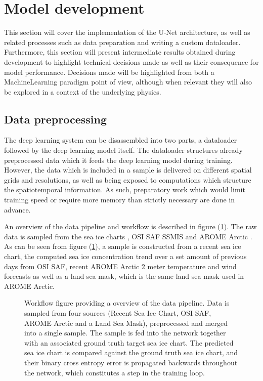 \documentclass[../main/thesis]{subfiles}
\begin{document}
\section{Model development}
\label{sec:developing a unet}
This section will cover the implementation of the U-Net architecture, as well as related processes such as data preparation and writing a custom dataloader. Furthermore, this section will present intermediate results obtained during development to highlight technical decisions made as well as their consequence for model performance. Decisions made will be highlighted from both a MachineLearning paradigm point of view, although when relevant they will also be explored in a context of the underlying physics.

\subsection{Data preprocessing}
The deep learning system can be disassembled into two parts, a dataloader followed by the deep learning model itself. The dataloader structures already preprocessed data which it feeds the deep learning model during training. However, the data which is included in a sample is delivered on different spatial grids and resolutions, as well as being exposed to computations which structure the spatiotemporal information. As such, preparatory work which would limit training speed or require more memory than strictly necessary are done in advance.

An overview of the data pipeline and workflow is described in figure (\ref{fig:data_pipeline}). The raw data is sampled from the sea ice charts \citep{Dinessen2020}, OSI SAF SSMIS \citep{Tonboe2017} and AROME Arctic \citep{Mueller2017}. As can be seen from figure (\ref{fig:data_pipeline}), a sample is constructed from a recent sea ice chart, the computed sea ice concentration trend over a set amount of previous days from OSI SAF, recent AROME Arctic 2 meter temperature and wind forecasts as well as a land sea mask, which is the same land sea mask used in AROME Arctic.

\begin{figure}
    \centering
    
    \caption{\label{fig:data_pipeline} Workflow figure providing a overview of the data pipeline. Data is sampled from four sources (Recent Sea Ice Chart, OSI SAF, AROME Arctic and a Land Sea Mask), preprocessed and merged into a single sample. The sample is fed into the network  together with an associated ground truth target sea ice chart. The predicted sea ice chart is compared against the ground truth sea ice chart, and their binary cross entropy error is propagated backwards throughout the network, which constitutes a step in the training loop.}
\end{figure}
\end{document}
